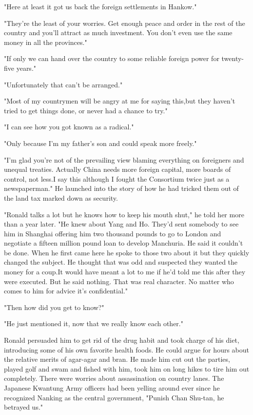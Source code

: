 \par "Here at least it got us back the foreign settlements in Hankow."
\par "They're the least of your worries. Get enough peace and order in the rest of the country and you'll attract as much investment. You don't even use the same money in all the provinces."
\par "If only we can hand over the country to some reliable foreign power for twenty-five years."
\par "Unfortunately that can't be arranged."
\par "Most of my countrymen will be angry at me for saying this,but they haven't tried to get things done, or never had a chance to try."
\par "I can see how you got known as a radical."
\par "Only because I'm my father's son and could speak more freely."
\par "I'm glad you're not of the prevailing view blaming everything on foreigners and unequal treaties. Actually China needs more foreign capital, more boards of control, not less.I say this although I fought the Consortium twice just as a newspaperman." He launched into the story of how he had tricked them out of the land tax marked down as security.
\par "Ronald talks a lot but he knows how to keep his mouth shut," he told her more than a year later. "He knew about Yang and Ho. They'd sent somebody to see him in Shanghai offering him two thousand pounds to go to London and negotiate a fifteen million pound loan to develop Manchuria. He said it couldn't be done. When he first came here he spoke to those two about it but they quickly changed the subject. He thought that was odd and suspected they wanted the money for a coup.It would have meant a lot to me if he'd told me this after they were executed. But he said nothing. That was real character. No matter who comes to him for advice it's confidential."
\par "Then how did you get to know?"
\par "He just mentioned it, now that we really know each other."
\par Ronald persuaded him to get rid of the drug habit and took charge of his diet, introducing some of his own favorite health foods. He could argue for hours about the relative merits of agar-agar and bran. He made him cut out the parties, played golf and swam and fished with him, took him on long hikes to tire him out completely. There were worries about assassination on country lanes. The Japanese Kwantung Army officers had been yelling around ever since he recognized Nanking as the central government, "Punish Chan Shu-tan, he betrayed us."
